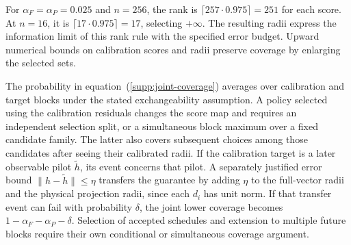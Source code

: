 For $\alpha_F=\alpha_P=0.025$ and $n=256$, the rank is $\lceil257\cdot0.975\rceil=251$ for each score. At $n=16$, it is $\lceil17\cdot0.975\rceil=17$, selecting $+\infty$. The resulting radii express the information limit of this rank rule with the specified error budget. Upward numerical bounds on calibration scores and radii preserve coverage by enlarging the selected sets.

The probability in equation~(\ref{supp:joint-coverage}) averages over calibration and target blocks under the stated exchangeability assumption. A policy selected using the calibration residuals changes the score map and requires an independent selection split, or a simultaneous block maximum over a fixed candidate family. The latter also covers subsequent choices among those candidates after seeing their calibrated radii. If the calibration target is a later observable pilot $\widetilde h$, its event concerns that pilot. A separately justified error bound $\|h-\widetilde h\|\le\eta$ transfers the guarantee by adding $\eta$ to the full-vector radii and the physical projection radii, since each $d_i$ has unit norm. If that transfer event can fail with probability $\delta$, the joint lower coverage becomes $1-\alpha_F-\alpha_P-\delta$. Selection of accepted schedules and extension to multiple future blocks require their own conditional or simultaneous coverage argument.
